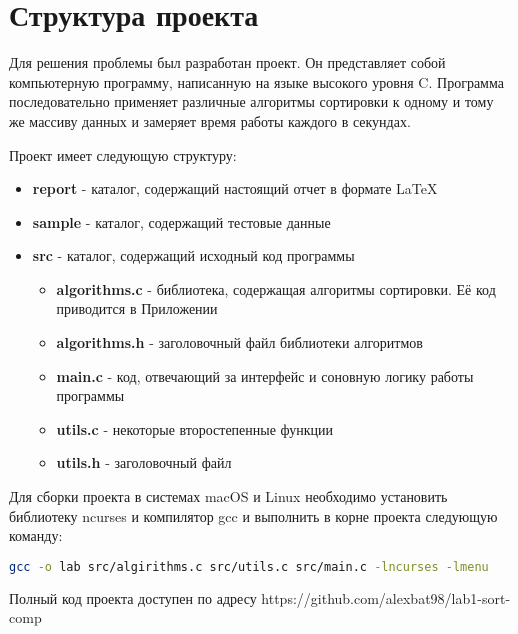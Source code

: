 \section{Структура проекта}
Для решения проблемы был разработан проект. Он представляет собой компьютерную
программу, написанную на языке высокого уровня C. Программа последовательно
применяет различные алгоритмы сортировки к одному и тому же массиву данных
и замеряет время работы каждого в секундах.\par
Проект имеет следующую структуру:
\begin{itemize}
    \item{\textbf{report} - каталог, содержащий настоящий отчет в формате \LaTeX}
    \item{\textbf{sample} - каталог, содержащий тестовые данные}
    \item{\textbf{src} - каталог, содержащий исходный код программы}
    \begin{itemize}
      \item{\textbf{algorithms.c} - библиотека, содержащая алгоритмы сортировки. Её код приводится в Приложении}
      \item{\textbf{algorithms.h} - заголовочный файл библиотеки алгоритмов}
      \item{\textbf{main.c} - код, отвечающий за интерфейс и соновную логику работы программы}
      \item{\textbf{utils.c} - некоторые второстепенные функции}
      \item{\textbf{utils.h} - заголовочный файл}
    \end{itemize}
\end{itemize}

Для сборки проекта в системах macOS и Linux необходимо установить библиотеку ncurses и компилятор gcc
и выполнить в корне проекта следующую команду:
\begin{lstlisting}[numbers=none,language=bash]
gcc -o lab src/algirithms.c src/utils.c src/main.c -lncurses -lmenu
\end{lstlisting}
Полный код проекта доступен по адресу https://github.com/alexbat98/lab1-sort-comp